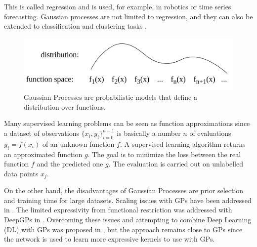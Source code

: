 This is called regression and is used, for example, in robotics or time series forecasting. Gaussian processes are not limited to regression, and they can also be extended to classification and clustering tasks \cite{kapoor2010gaussian} \cite{kim2007clustering}. 
\begin{figure}
	\centering
	\includegraphics[width=0.9\linewidth]{Images/GP.png}
	\caption{Gaussian Processes are probabilistic models that define a distribution over functions.}
	\label{fig:gp}
\end{figure}
Many supervised learning problems can be seen as function approximations since a dataset of observations $ \{x_i, y_i\}^{n-1}_{i=0}$ is basically a number $n$ of evaluations $y_i = f(x_i)$ of an unknown function $f$. A supervised learning algorithm returns an approximated function $g$. The goal is to minimize the loss between the real function $f$ and the predicted one $g$. The evaluation is carried out on unlabelled data points $x_j$.

On the other hand, the disadvantages of Gaussian Processes are prior selection and training time for large datasets. Scaling issues with GPs have been addressed in \cite{snelson2006sparse}. The limited expressivity from functional restriction was addressed with DeepGPs in \cite{damianou2013deep}  \cite{salimbeni2017doubly}. Overcoming these issues and attempting to combine Deep Learning (DL) with GPs was proposed in \cite{wilson2016deep}, but the approach remains close to GPs since the network is used to learn more expressive kernels to use with GPs.

